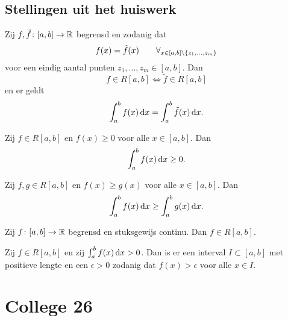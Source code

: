 \documentclass{2wa40summary}
\begin{document}
		\subsection{Stellingen uit het huiswerk}
			\begin{theorem}
				Zij $ f, \tilde f \colon [a,b] \to \mathbb{R} $ begrensd en zodanig dat 
				\[ 
					f(x) = \tilde f(x) \qquad \forall_{x \in [a,b] \backslash\lbrace z_1, \ldots, z_m\rbrace}
				 \]
				 voor een eindig aantal punten $ z_1, \ldots, z_m \in [a,b] $. Dan
				 \[ 
					 f \in R[a,b] \iff \tilde f \in R[a,b]
				  \]
				  en er geldt
				  \[ 
					  \int_a^b f(x)\mathop{}\!\mathrm{d} x = \int_a^b \tilde f(x)\mathop{}\!\mathrm{d} x.
				   \]
			\end{theorem}
			\begin{theorem}
				Zij $f \in R[a,b]$ en $f(x) \ge 0$ voor alle $x \in [a,b]$. Dan 
				\[ 
					\int_a^b f(x)\mathop{}\!\mathrm{d} x \ge 0.
				 \]
			\end{theorem}
			\begin{theorem}
				Zij $f,g \in R[a,b]$ en $f(x) \ge g(x)$ voor alle $x \in [a,b]$. Dan
				\[ 
					\int_a^b f(x)\mathop{}\!\mathrm{d} x \ge \int_a^b g(x)\mathop{}\!\mathrm{d} x.
				 \]
			\end{theorem}
			\begin{theorem}
				Zij $f\colon [a,b] \to \mathbb{R}$ begrensd en stuksgewijs continu. Dan $f\in R[a,b]$.
			\end{theorem}
			\begin{theorem}
				Zij $f \in R[a,b]$ en zij $\int_a^b f(x) \mathop{}\!\mathrm{d} x >0$. Dan is er een interval $I \subset [a,b]$ met positieve lengte en een $\epsilon >0$ zodanig dat $f(x) > \epsilon$ voor alle $x \in I$.
			\end{theorem}
		
		\newpage
		\section{College 26}
\end{document}

